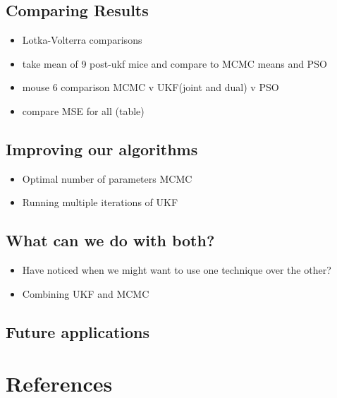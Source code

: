 \documentclass{article}
\begin{document}
\subsection{Comparing Results}
\begin{itemize}
    \item Lotka-Volterra comparisons
    \item take mean of 9 post-ukf mice and compare to MCMC means and PSO
    \item mouse 6 comparison MCMC v UKF(joint and dual) v PSO
    \item compare MSE for all (table)
\end{itemize}
\subsection{Improving our algorithms}
\begin{itemize}
    \item Optimal number of parameters MCMC
    \item Running multiple iterations of UKF
\end{itemize}
\subsection{What can we do with both?}
\begin{itemize}
    \item Have noticed when we might want to use one technique over the other?
    \item Combining UKF and MCMC
\end{itemize}
\subsection{Future applications}


\section{References}
\end{document}
